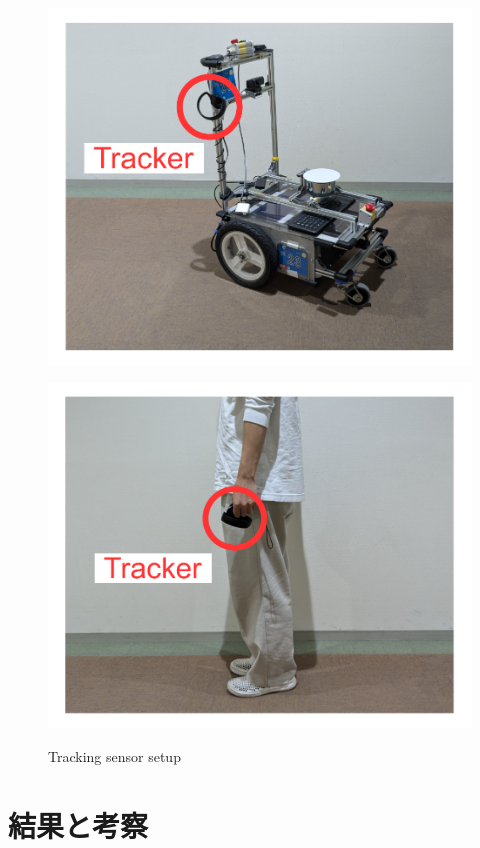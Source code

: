 \begin{figure}[H]
  \centering
  \begin{minipage}{0.45\textwidth}
    \centering
    \includegraphics[width=\textwidth]{images/tracking-robot.pdf}
    \label{fig:tracking-robot}
  \end{minipage}
  \begin{minipage}{0.45\textwidth}
    \centering
    \includegraphics[width=\textwidth]{images/tracking-ped.pdf}
    \label{fig:tracking-ped}
  \end{minipage}
  \caption{Tracking sensor setup}
  \label{fig:tracking}
\end{figure}

\section{結果と考察}

\newpage

